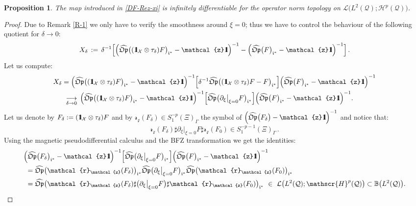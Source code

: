 \documentclass[12pt]{article}
\newtheorem{proposition}[theorem]{Proposition}
\theoremstyle{definition}
\def\Op{\mathfrak{Op}}
\def\X{\mathcal X}
\def\T{\mathcal{Q}}
\def\bb1{{\rm{1}\hspace{-3pt}\mathbf{l}}}
\def\zz{\mathcal{z}}
\def\beq{\begin{equation}}
\def\eeq{\end{equation}}
\numberwithin{equation}{section}
\begin{document}
\begin{proposition}\label{P-PNf-2}
	The map introduced  in \eqref{DF-Rez-xi} is infinitely differentiable for the operator norm topology on $\mathcal{L}\big(L^2(\T);\mathscr{H}^p(\T)\big)$.
\end{proposition}
\begin{proof}
Due to Remark \ref{R-1} we only have to verify the smoothness around $\xi=0$; thus we have to control the behaviour of the following quotient for $\delta\rightarrow0$:
\beq
X_\delta\,:=\,\delta^{-1}\Big[\Big(\widehat{\Op}\big((\bb1_{\X}\otimes\tau_{\delta})F\big)_{\mathfrak{i}^*}-\zz\bb1\Big)^{-1}-\Big(\widehat{\Op}\big(F\big)_{\mathfrak{i}^*}-\zz\bb1\Big)^{-1}\Big]\,.
\eeq
Let us compute:
\begin{align*}
	X_\delta&=\Big(\widehat{\Op}\big((\bb1_{\X}\otimes\tau_{\delta})F\big)_{\mathfrak{i}^*}-\zz\bb1\Big)^{-1}\Big[\delta^{-1}\widehat{\Op}\big((\bb1_{\X}\otimes\tau_{\delta})F-F\big)_{\mathfrak{i}^*}\Big]\Big(\widehat{\Op}\big(F\big)_{\mathfrak{i}^*}-\zz\bb1\Big)^{-1}\\
	&\ \underset{\delta\rightarrow0}{\longrightarrow}\,\Big(\widehat{\Op}\big((\bb1_{\X}\otimes\tau_{\delta})F\big)_{\mathfrak{i}^*}-\zz\bb1\Big)^{-1}\Big[\widehat{\Op}\big(\partial_\xi\big|_{\xi=0}{F}\big)_{\mathfrak{i}^*}\Big]\Big(\widehat{\Op}\big(F\big)_{\mathfrak{i}^*}-\zz\bb1\Big)^{-1}.
\end{align*}
Let us denote by $ F_{\delta}:=(\bb1_{\X}\otimes\tau_{\delta})F$ and by $\mathcal{r}_{\zz}(F_\delta)\in{S}^{-p}_1(\Xi)_{\Gamma}$ the symbol of $\Big(\widehat{\Op}\big(F_{\delta}\big)-\zz\bb1\Big)^{-1}$ and notice that: 
\beq
\mathcal{r}_{\zz}(F_\delta)\sharp\partial_\xi\big|_{\xi=0}{F}\sharp\mathcal{r}_{\zz}(F_0)\in{S}^{-p-1}_1(\Xi)_\Gamma\,.
\eeq
Using the magnetic pseudodifferential calculus and the BFZ transformation we get the identities:
\begin{align*}
	&\Big(\widehat{\Op}\big(F_{\delta}\big)_{\mathfrak{i}^*}-\zz\bb1\Big)^{-1}\Big[\widehat{\Op}\big(\partial_\xi\big|_{\xi=0}{F}\big)_{\mathfrak{i}^*}\Big]\Big(\widehat{\Op}\big(F\big)_{\mathfrak{i}^*}-\zz\bb1\Big)^{-1}\\
	&\ =\widehat{\Op}\big(\mathcal{r}_{\zz}(F_\delta)\big)_{\mathfrak{i}^*}\widehat{\Op}\big(\partial_\xi\big|_{\xi=0}{F}\big)_{\mathfrak{i}^*}\widehat{\Op}\big(\mathcal{r}_{\zz}(F_0)\big)_{\mathfrak{i}^*}\\
	&\ =\widehat{\Op}\big(\mathcal{r}_{\zz}(F_\delta)\sharp\big(\partial_\xi\big|_{\xi=0}{F}\big)\sharp\mathcal{r}_{\zz}(F_0)\big)_{\mathfrak{i}^*}\ \in\ \mathcal{L}\big(L^2(\T);\mathscr{H}^p(\T)\big)\subset\mathbb{B}\big(L^2(\T)\big).

\end{align*}
\end{proof}
\end{document}
